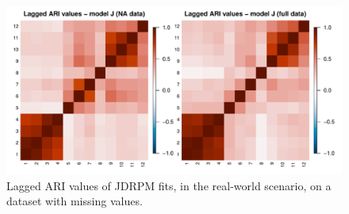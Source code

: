 \documentclass[12pt,	%
	a4paper,		%
	twoside,		%
	openright,		%
	titlepage,%
	]{book}
\theoremstyle{definition}
\begin{document}
\begin{figure}[!ht]
    \centering
    \includegraphics[width=1\linewidth]{Testing/NA data/space/ari.pdf}
    \caption[Lagged ARI values of JDRPM, real-world scenario, dataset with missing values]{Lagged ARI values of JDRPM fits, in the real-world scenario, on a dataset with missing values.}
    \label{fig: ari space na}
\end{figure}

\end{document}
